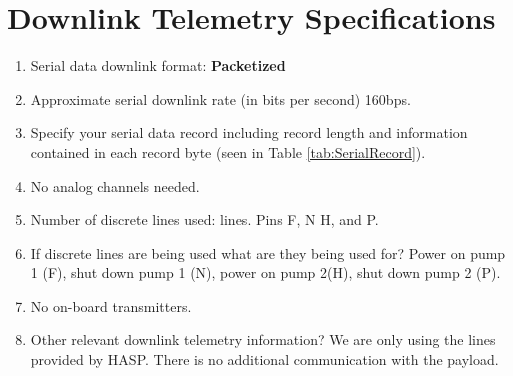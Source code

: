 \newpage
\section{Downlink Telemetry Specifications}
\label{sec:Downlink}

\hspace*{0.5cm}
\begin{minipage}{\linewidth-0.5cm}
  \begin{enumerate}[label=\Alph*.]
    
  \item Serial data downlink format: \textbf{Packetized}
    
  \item Approximate serial downlink rate (in bits per second) \num{160}bps.
    
  \item Specify your serial data record including record length and information contained in each record byte (seen in Table \ref{tab:SerialRecord}).

  \item No analog channels needed.

  \item Number of discrete lines used:  lines. Pins F, N H, and P.

  \item If discrete lines are being used what are they being used for? \newline
        Power on pump 1 (F), shut down pump 1 (N), power on pump 2(H), shut down pump 2 (P).
        
  \item No on-board transmitters.

  \item Other relevant downlink telemetry information? \newline
        We are only using the lines provided by HASP. There is no additional communication with the payload.
    
  \end{enumerate}
\end{minipage}

